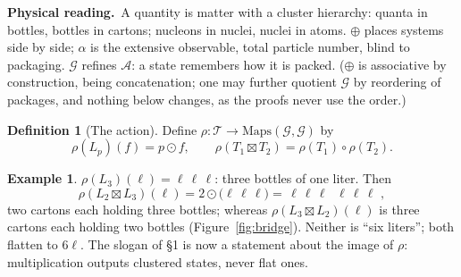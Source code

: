 \documentclass[11pt]{article}
\newcommand{\cT}{\mathcal{T}}   %
\newcommand{\cG}{\mathcal{G}}   %
\newcommand{\cA}{\mathcal{A}}   %
\newcommand{\pkg}[1]{\boxed{#1}}
\newcommand{\act}{\rho}
\newcommand{\physread}{\medskip\noindent\textbf{Physical reading.}\ }
\numberwithin{equation}{section}
\theoremstyle{plain}
\theoremstyle{definition}
\newtheorem{definition}[theorem]{Definition}
\newtheorem{example}[theorem]{Example}
\theoremstyle{remark}
\begin{document}
\physread A quantity is matter with a cluster hierarchy: quanta in bottles,
bottles in cartons; nucleons in nuclei, nuclei in atoms. $\oplus$ places systems side
by side; $\alpha$ is the extensive observable, total particle number, blind to
packaging. $\cG$ refines $\cA$: a state remembers how it is packed. ($\oplus$ is
associative by construction, being concatenation; one may further quotient $\cG$ by
reordering of packages, and nothing below changes, as the proofs never use the order.)

\begin{definition}[The action]\label{def:action}
Define $\act \colon \cT \to \mathrm{Maps}(\cG, \cG)$ by
\[
\act(L_p)(f) = p \odot f,
\qquad
\act(T_1 \boxtimes T_2) = \act(T_1) \circ \act(T_2).
\]
\end{definition}

\begin{example}\label{ex:liters}
$\act(L_3)(\ell) = \pkg{\ell}\,\pkg{\ell}\,\pkg{\ell}$: three bottles of one liter.
Then
\[
\act(L_2 \boxtimes L_3)(\ell)
= 2 \odot \bigl(\pkg{\ell}\,\pkg{\ell}\,\pkg{\ell}\bigr)
= \pkg{\,\pkg{\ell}\,\pkg{\ell}\,\pkg{\ell}\,}\;\pkg{\,\pkg{\ell}\,\pkg{\ell}\,\pkg{\ell}\,}\,,
\]
two cartons each holding three bottles; whereas $\act(L_3 \boxtimes L_2)(\ell)$ is
three cartons each holding two bottles (Figure~\ref{fig:bridge}). Neither is ``six
liters''; both flatten to $6\ell$. The slogan of \S1 is now a statement about the
image of $\act$: multiplication outputs clustered states, never flat ones.
\end{example}
\end{document}
